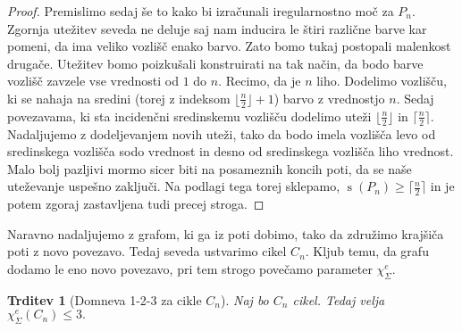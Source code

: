 \documentclass[12pt,a4paper,twoside]{article}
\theoremstyle{definition} %
\theoremstyle{plain} %
\newtheorem{trditev}[definicija]{Trditev}
\newcommand{\ec}{\chi_{\Sigma}^e}
\numberwithin{equation}{section}  %
\DeclareMathOperator{\s}{s}
\begin{document}
\begin{proof}
Premislimo sedaj še to kako bi izračunali iregularnostno moč za $P_n$. Zgornja utežitev seveda ne deluje saj nam inducira le štiri različne barve kar pomeni, da ima veliko vozlišč enako barvo. Zato bomo tukaj postopali malenkost drugače. Utežitev bomo poizkušali konstruirati na tak način, da bodo barve vozlišč zavzele vse vrednosti od $1$ do $n$. Recimo, da je $n$ liho. Dodelimo vozlišču, ki se nahaja na sredini (torej z indeksom $\lfloor \frac{n}{2} \rfloor + 1$) barvo z vrednostjo $n$. Sedaj povezavama, ki sta incidenčni sredinskemu vozlišču dodelimo uteži $\lfloor \frac{n}{2} \rfloor$ in $\lceil \frac{n}{2} \rceil$. Nadaljujemo z dodeljevanjem novih uteži, tako da bodo imela vozlišča levo od sredinskega vozlišča sodo vrednost in desno od sredinskega vozlišča liho vrednost. Malo bolj pazljivi mormo sicer biti na posameznih koncih poti, da se naše uteževanje uspešno zaključi. Na podlagi tega torej sklepamo, $\s(P_n) \ge \lceil \frac{n}{2} \rceil$ in je potem zgoraj zastavljena tudi precej stroga.
\end{proof}
Naravno nadaljujemo z grafom, ki ga iz poti dobimo, tako da združimo krajšiča poti z novo povezavo. Tedaj seveda ustvarimo cikel $C_n$. Kljub temu, da grafu dodamo le eno novo povezavo, pri tem strogo povečamo parameter $\ec.$
\begin{trditev}[Domneva 1-2-3 za cikle $C_n$]
Naj bo $C_n$ cikel. Tedaj velja $\ec(C_n) \le 3.$
\end{trditev}
\end{document}
